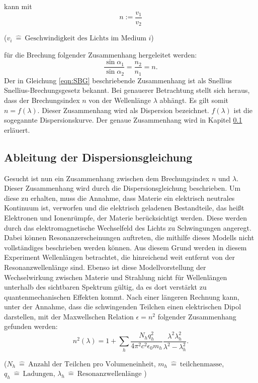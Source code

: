 kann mit
\begin{equation}
 n := \frac{v_1}{v_2} \label{eqn:LiM}
\end{equation}
\begin{center}
 \tiny {($v_i \: \hat{=} \:\text{Geschwindigkeit des Lichts im Medium $i$}$)}
\end{center}
für die Brechung folgender Zusammenhang hergeleitet werden:
\begin{equation}
  \frac{\sin{\alpha_1}}{\sin{\alpha_2}} = \frac{n_2}{n_1} = n \text{.} \label{eqn:SBG}
\end{equation}
Der in Gleichung \eqref{eqn:SBG} beschriebende Zusammenhang ist als Snellius Snellius-Brechungsgesetz bekannt.
Bei genauerer Betrachtung stellt sich heraus, dass der Brechungsindex $n$ von der Wellenlänge $\lambda$ abhängt.
Es gilt somit $n=f(\lambda)$. Dieser Zusammenhang wird als Dispersion bezeichnet. $f(\lambda)$ ist die sogegannte Dispersionskurve.
Der genaue Zusammenhang wird in Kapitel \ref{sec:AdD} erläuert.

\subsection{Ableitung der Dispersionsgleichung}\label{sec:AdD}
Gesucht ist nun ein Zusammenhang zwischen dem Brechungsindex $n$ und $\lambda$. Dieser Zusammenhang wird durch die Dispersionsgleichung beschrieben.
Um diese zu erhalten, muss die Annahme, dass Materie ein elektrisch neutrales Kontinuum ist, verworfen und die elektrisch geladenen Bestandteile, das heißt
Elektronen und Ionenrümpfe, der Materie berücksichtigt werden. Diese werden durch das elektromagnetische Wechselfeld des Lichts zu Schwingungen angeregt.
Dabei können Resonanzerscheinungen auftreten, die mithilfe dieses Modells nicht vollständiges beschrieben werden können. Aus diesem Grund werden in diesem
Experiment Wellenlängen betrachtet, die hinreichend weit entfernt von der Resonanzwellenlänge sind.
Ebenso ist diese Modellvorstellung der Wechselwirkung zwischen Materie und Strahlung  nicht für Wellenlängen unterhalb des sichtbaren Spektrum gültig,
da es dort verstärkt zu quantenmechanischen Effekten kommt.
Nach einer längeren Rechnung kann, unter der Annahme, dass die schwingenden Teilchen einen elektrischen Dipol darstellen, mit der Maxwellschen Relation
$\epsilon=n^2$ folgender Zusammenhang gefunden werden:
\begin{equation}
n^2(\lambda)=1+\sum_h\frac{N_hq^2_h}{4\pi^2 c^2\epsilon_0 m_h}\frac{\lambda^2\lambda^2_h}{\lambda^2-\lambda^2_h}\text{.}\label{eqn:n^2}
\end{equation}
\begin{center}
 \tiny {($N_h \: \hat{=} \:\text{Anzahl der Teilchen pro Volumeneinheit}$, $m_h \: \hat{=} \:\text{teilchenmasse}$, $q_h \: \hat{=} \:\text{Ladungen}$, $\lambda_h \: \hat{=} \:\text{Resonanzwellenlänge}$ )}
\end{center}

